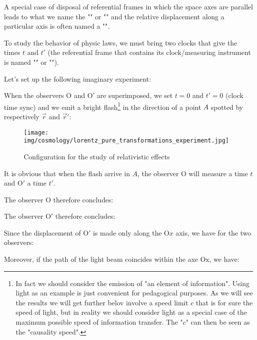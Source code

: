 		\begin{tcolorbox}[title=Remark,colframe=black,arc=10pt]
		A special case of disposal of referential frames in which the space axes are parallel leads to what we name the "" or "" and the relative displacement along a particular axis is often named a "".
		\end{tcolorbox}	
		
		To study the behavior of physic laws, we must bring two clocks that give the times $t$ and $t'$ (the referential frame that contains its clock/measuring instrument is named "" or "").
		
		Let's set up the following imaginary experiment:
		
		When the observers $\text{O}$ and $\text{O'}$ are superimposed, we set $t = 0$ and $t' = 0$ (clock time sync) and we emit a bright flash\footnote{In fact we should consider the emission of "an element of information". Using light as an example is just convenient for pedagogical purposes. As we will see the results we will get further belov involve a speed limit $c$ that is for sure the speed of light, but in reality we should consider light as a special case of the maximum possible speed of information transfer. The "$c$" can then be seen as the "causality speed".} in the direction of a point $A$ spotted by respectively $\vec{r}$ and $\vec{r}'$:
		\begin{figure}[H]
			\begin{center}
			\texttt{[image: img/cosmology/lorentz\_pure\_transformations\_experiment.jpg]}
			\end{center}	
			\caption{Configuration for the study of relativistic effects}
		\end{figure}
		It is obvious that when the flash arrive in $A$, the observer $\text{O}$ will measure a time $t$ and $\text{O}'$ a time $t'$.
		
		The observer $\text{O}$ therefore concludes:
		
		The observer $\text{O}'$ therefore concludes:
		
		Since the displacement of $\text{O}'$ is made only along the $\text{O}x$ axis, we have for the two observers:
		
		Moreover, if the path of the light beam coincides within the axe $\text{Ox}$, we have:
		
